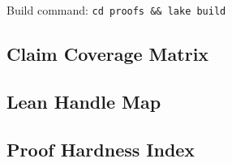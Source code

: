 \noindent Build command: \texttt{cd proofs \&\& lake build}

\subsection{Claim Coverage Matrix}



\subsection{Lean Handle Map}



\subsection{Proof Hardness Index}


